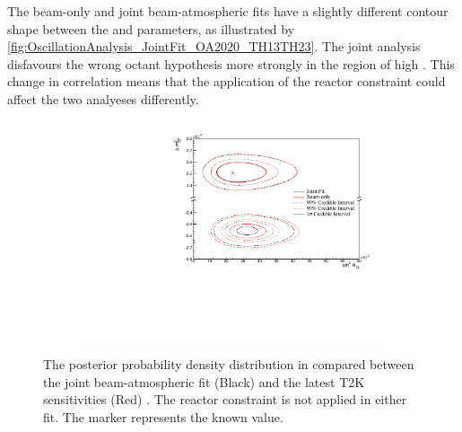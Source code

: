 The beam-only and joint beam-atmospheric fits have a slightly different contour shape between the  and  parameters, as illustrated by \autoref{fig:OscillationAnalysis_JointFit_OA2020_TH13TH23}. The joint analysis disfavours the wrong octant hypothesis more strongly in the region of high . This change in correlation means that the application of the reactor constraint could affect the two analyeses differently.

\begin{figure}[h]
  \begin{subfigure}[t]{0.91\textwidth}
    \includegraphics[width=\textwidth, trim={0mm 0mm 0mm 0mm}, clip,page=1]{Figures/OA/JointFit_OA2020_Comp/ContourComparison_2D_th13_dm32_BH_0_woRC_UnSmeared_CredibleInterval.pdf}
  \end{subfigure}
  \caption{The posterior probability density distribution in  compared between the joint beam-atmospheric fit (Black) and the latest T2K sensitivities (Red) \cite{Dunne2020-uf, t2k_tn_393}. The reactor constraint is not applied in either fit. The marker represents the known value.}
  \label{fig:OscillationAnalysis_JointFit_OA2020_DM32TH13}
\end{figure}

